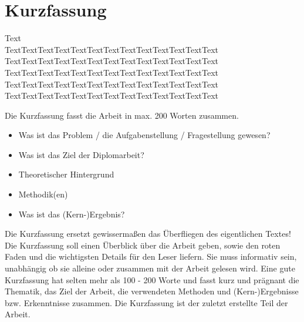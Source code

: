 %
%
\newpage

%
%
\section*{Kurzfassung}
Text\\
TextTextTextTextTextTextTextTextTextTextTextTextText TextTextTextTextTextTextTextTextTextTextTextTextText TextTextTextTextTextTextTextTextTextTextTextTextText TextTextTextTextTextTextTextTextTextTextTextTextText TextTextTextTextTextTextTextTextTextTextTextTextText

\color{red} 
Die Kurzfassung fasst die Arbeit in max. 200 Worten zusammen. 
\begin{itemize}
 \item Was ist das Problem / die Aufgabenstellung / Fragestellung gewesen?
 \item Was ist das Ziel der Diplomarbeit?
 \item Theoretischer Hintergrund
 \item Methodik(en)
 \item Was ist das (Kern-)Ergebnis?
\end{itemize}
Die Kurzfassung ersetzt gewisserma{\ss}en das \"Uberfliegen des eigentlichen Textes!
Die Kurzfassung soll einen \"Uberblick \"uber die Arbeit geben, sowie den \glqq{}roten Faden\grqq{} und die wichtigsten Details f\"ur den Leser liefern. Sie muss informativ sein, unabh\"angig ob sie alleine oder zusammen mit der Arbeit gelesen wird.
Eine gute Kurzfassung hat selten mehr als 100 - 200 Worte und fasst kurz und pr\"agnant die Thematik, das Ziel der Arbeit, die verwendeten Methoden und (Kern-)Ergebnisse bzw. Erkenntnisse zusammen. Die Kurzfassung ist der zuletzt erstellte Teil der Arbeit.

\color{black} 
